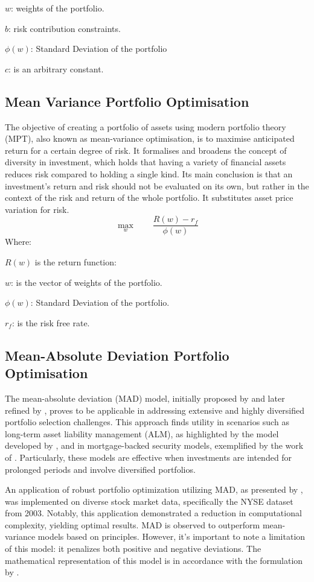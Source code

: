 $w$: weights of the portfolio.

$b$: risk contribution constraints.

$\phi(w)$: Standard Deviation of the portfolio

$c$: is an arbitrary constant.

\subsection{Mean Variance Portfolio Optimisation}
The objective of creating a portfolio of assets using modern portfolio theory (MPT), also known as mean-variance optimisation, is to maximise anticipated return for a certain degree of risk. It formalises and broadens the concept of diversity in investment, which holds that having a variety of financial assets reduces risk compared to holding a single kind. Its main conclusion is that an investment's return and risk should not be evaluated on its own, but rather in the context of the risk and return of the whole portfolio. It substitutes asset price variation for risk. \citep{Markowitz1952}\\

\[\underset{w}{\max}\qquad \frac{R (w) - r_{f}}{\phi(w)}\]
Where:

$R(w)$ is the return function:

$w$: is the vector of weights of the portfolio.

$\phi(w)$: Standard Deviation of the portfolio.

$r_{f}$: is the risk free rate.\\

\subsection{Mean-Absolute Deviation Portfolio Optimisation}
The mean-absolute deviation (MAD) model, initially proposed by \citep{Konno1991} and later refined by \citep{Konno2005}, proves to be applicable in addressing extensive and highly diversified portfolio selection challenges. This approach finds utility in scenarios such as long-term asset liability management (ALM), as highlighted by the model developed by \cite{Clark2006}, and in mortgage-backed security models, exemplified by the work of \citep{Hayre2002}. Particularly, these models are effective when investments are intended for prolonged periods and involve diversified portfolios.

An application of robust portfolio optimization utilizing MAD, as presented by \cite{Moon2011}, was implemented on diverse stock market data, specifically the NYSE dataset from 2003. Notably, this application demonstrated a reduction in computational complexity, yielding optimal results. MAD is observed to outperform mean-variance models based on \citep{Markowitz1952} principles. However, it's important to note a limitation of this model: it penalizes both positive and negative deviations. The mathematical representation of this model is in accordance with the formulation by \citep{Konno1991}.

